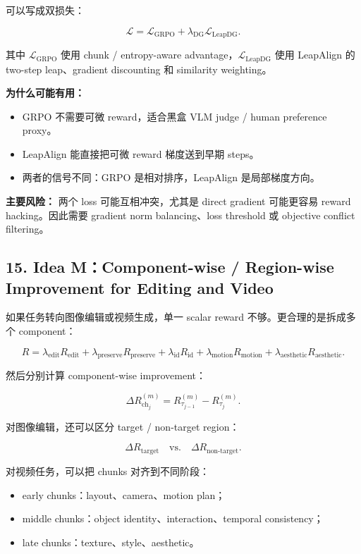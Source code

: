 可以写成双损失：

\[
\mathcal{L}
=
\mathcal{L}_{\mathrm{GRPO}}
+
\lambda_{\mathrm{DG}}\mathcal{L}_{\mathrm{LeapDG}}.
\]

其中 \(\mathcal{L}_{\mathrm{GRPO}}\) 使用 chunk / entropy-aware advantage，\(\mathcal{L}_{\mathrm{LeapDG}}\) 使用 LeapAlign 的 two-step leap、gradient discounting 和 similarity weighting。

\textbf{为什么可能有用：}

\begin{itemize}[leftmargin=1.5em]
  \item GRPO 不需要可微 reward，适合黑盒 VLM judge / human preference proxy。
  \item LeapAlign 能直接把可微 reward 梯度送到早期 steps。
  \item 两者的信号不同：GRPO 是相对排序，LeapAlign 是局部梯度方向。
\end{itemize}

\textbf{主要风险：} 两个 loss 可能互相冲突，尤其是 direct gradient 可能更容易 reward hacking。因此需要 gradient norm balancing、loss threshold 或 objective conflict filtering。

\subsection{15. Idea M：Component-wise / Region-wise Improvement for Editing and Video}

如果任务转向图像编辑或视频生成，单一 scalar reward 不够。更合理的是拆成多个 component：

\[
R
=\lambda_{\mathrm{edit}}R_{\mathrm{edit}}
+\lambda_{\mathrm{preserve}}R_{\mathrm{preserve}}
+\lambda_{\mathrm{id}}R_{\mathrm{id}}
+\lambda_{\mathrm{motion}}R_{\mathrm{motion}}
+\lambda_{\mathrm{aesthetic}}R_{\mathrm{aesthetic}}.
\]

然后分别计算 component-wise improvement：

\[
\Delta R^{(m)}_{\mathrm{ch}_j}
=
R^{(m)}_{\tau_{j-1}}-R^{(m)}_{\tau_j}.
\]

对图像编辑，还可以区分 target / non-target region：

\[
\Delta R_{\mathrm{target}}
\quad \text{vs.} \quad
\Delta R_{\mathrm{non\text{-}target}}.
\]

对视频任务，可以把 chunks 对齐到不同阶段：

\begin{itemize}[leftmargin=1.5em]
  \item early chunks：layout、camera、motion plan；
  \item middle chunks：object identity、interaction、temporal consistency；
  \item late chunks：texture、style、aesthetic。
\end{itemize}

